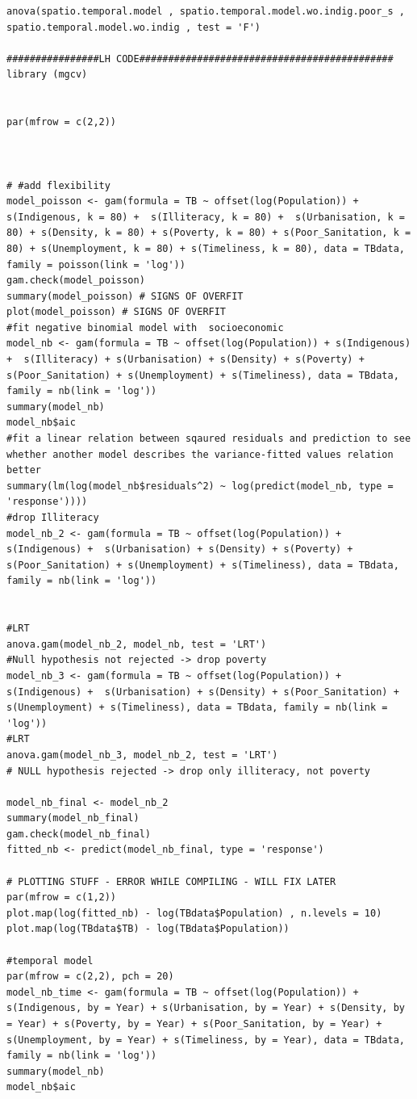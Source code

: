 \documentclass{article}
\begin{document}
\begin{verbatim}
anova(spatio.temporal.model , spatio.temporal.model.wo.indig.poor_s , spatio.temporal.model.wo.indig , test = 'F')

################LH CODE############################################
library (mgcv)


par(mfrow = c(2,2))



# #add flexibility
model_poisson <- gam(formula = TB ~ offset(log(Population)) + s(Indigenous, k = 80) +  s(Illiteracy, k = 80) +  s(Urbanisation, k = 80) + s(Density, k = 80) + s(Poverty, k = 80) + s(Poor_Sanitation, k = 80) + s(Unemployment, k = 80) + s(Timeliness, k = 80), data = TBdata, family = poisson(link = 'log'))
gam.check(model_poisson)
summary(model_poisson) # SIGNS OF OVERFIT
plot(model_poisson) # SIGNS OF OVERFIT
#fit negative binomial model with  socioeconomic
model_nb <- gam(formula = TB ~ offset(log(Population)) + s(Indigenous) +  s(Illiteracy) + s(Urbanisation) + s(Density) + s(Poverty) + s(Poor_Sanitation) + s(Unemployment) + s(Timeliness), data = TBdata, family = nb(link = 'log'))
summary(model_nb)
model_nb$aic
#fit a linear relation between sqaured residuals and prediction to see whether another model describes the variance-fitted values relation better
summary(lm(log(model_nb$residuals^2) ~ log(predict(model_nb, type = 'response'))))
#drop Illiteracy
model_nb_2 <- gam(formula = TB ~ offset(log(Population)) + s(Indigenous) +  s(Urbanisation) + s(Density) + s(Poverty) + s(Poor_Sanitation) + s(Unemployment) + s(Timeliness), data = TBdata, family = nb(link = 'log'))


#LRT
anova.gam(model_nb_2, model_nb, test = 'LRT')
#Null hypothesis not rejected -> drop poverty
model_nb_3 <- gam(formula = TB ~ offset(log(Population)) + s(Indigenous) +  s(Urbanisation) + s(Density) + s(Poor_Sanitation) + s(Unemployment) + s(Timeliness), data = TBdata, family = nb(link = 'log'))
#LRT
anova.gam(model_nb_3, model_nb_2, test = 'LRT')
# NULL hypothesis rejected -> drop only illiteracy, not poverty

model_nb_final <- model_nb_2
summary(model_nb_final)
gam.check(model_nb_final)
fitted_nb <- predict(model_nb_final, type = 'response')

# PLOTTING STUFF - ERROR WHILE COMPILING - WILL FIX LATER
par(mfrow = c(1,2))
plot.map(log(fitted_nb) - log(TBdata$Population) , n.levels = 10)
plot.map(log(TBdata$TB) - log(TBdata$Population))

#temporal model
par(mfrow = c(2,2), pch = 20)
model_nb_time <- gam(formula = TB ~ offset(log(Population)) + s(Indigenous, by = Year) + s(Urbanisation, by = Year) + s(Density, by = Year) + s(Poverty, by = Year) + s(Poor_Sanitation, by = Year) + s(Unemployment, by = Year) + s(Timeliness, by = Year), data = TBdata, family = nb(link = 'log'))
summary(model_nb)
model_nb$aic


\end{verbatim}
\end{document}
